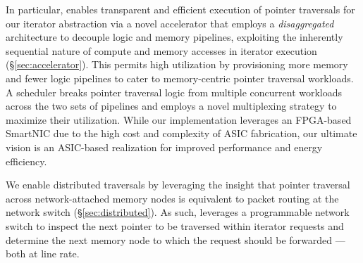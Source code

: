 
In particular, \name enables transparent and efficient execution of pointer traversals for our iterator abstraction via a novel accelerator that employs a \emph{disaggregated} architecture to decouple logic and memory pipelines, exploiting the inherently sequential nature of compute and memory accesses in iterator execution (\S\ref{sec:accelerator}). This permits high utilization by provisioning more memory and fewer logic pipelines to cater to memory-centric pointer traversal workloads. A scheduler breaks pointer traversal logic from multiple concurrent workloads across the two sets of pipelines and employs a novel multiplexing strategy to maximize their utilization. While our implementation leverages an FPGA-based SmartNIC due to the high cost and complexity of ASIC fabrication, our ultimate vision is an ASIC-based realization for improved performance and energy efficiency. 

We enable distributed traversals by leveraging the insight that pointer traversal across network-attached memory nodes is equivalent to packet routing at the network switch (\S\ref{sec:distributed}). As such, \name leverages a programmable network switch to inspect the next pointer to be traversed within iterator requests and determine the next memory node to which the request should be forwarded --- both at line rate. %


